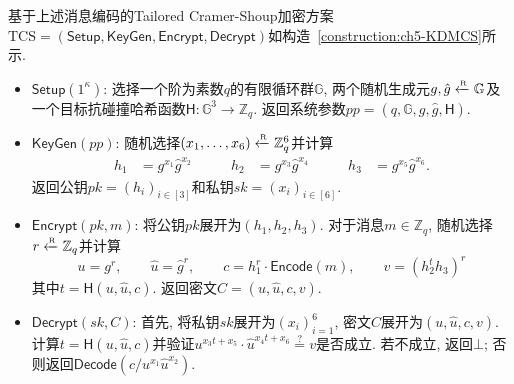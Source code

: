 基于上述消息编码的Tailored Cramer-Shoup加密方案$\text{TCS} = (\mathsf{Setup}, \mathsf{KeyGen}, \mathsf{Encrypt}, \mathsf{Decrypt})$如构造~\ref{construction:ch5-KDMCS}所示.

\begin{construction}\label{construction:ch5-KDMCS}
\begin{itemize}
\item $\mathsf{Setup}(1^\kappa)$: 选择一个阶为素数$q$的有限循环群$\mathbb{G}$, 两个随机生成元$g,\hat{g} \xleftarrow{\textup{\tiny R}} \mathbb{G}$及一个目标抗碰撞哈希函数$\mathsf{H}: \mathbb{G}^3 \rightarrow \mathbb{Z}_q$. 返回系统参数$pp = (q,\mathbb{G}, g, \hat{g}, \mathsf{H})$.

\item $\mathsf{KeyGen}(pp)$: 随机选择$(x_1,\ldots, x_6) \xleftarrow{\textup{\tiny R}} \mathbb{Z}_q^6$并计算
\begin{align*}
h_1 & = g^{x_1} \hat{g}^{x_2} & \qquad h_2 & = g^{x_3} \hat{g}^{x_4} & \qquad h_3 & = g^{x_5}\hat{g}^{x_6}.
\end{align*}
返回公钥$pk = (h_i)_{i\in[3]}$和私钥$sk = (x_i)_{i \in [6]}$.

\item $\mathsf{Encrypt}(pk, m)$: 将公钥$pk$展开为$(h_1, h_2, h_3)$. 对于消息$m \in \mathbb{Z}_q$, 随机选择$r \xleftarrow{\textup{\tiny R}} \mathbb{Z}_q$并计算
\begin{displaymath}
u = g^r, \qquad \hat{u} = \hat{g}^r, \qquad c = h_1^r \cdot \mathsf{Encode}(m), \qquad v = (h_2^th_3)^r
\end{displaymath}
其中$t = \mathsf{H}(u, \hat{u}, c)$. 返回密文$C = (u, \hat{u}, c, v)$.

\item $\mathsf{Decrypt}(sk, C)$: 首先, 将私钥$sk$展开为$(x_i)_{i = 1}^6$, 密文$C$展开为$(u,\hat{u}, c, v)$. 计算$t = \mathsf{H}(u, \hat{u}, c)$并验证$u^{x_3t + x_5} \cdot \hat{u}^{x_4t + x_6} \overset{?}{=} v$是否成立. 若不成立, 返回$\bot$; 否则返回$\mathsf{Decode}(c/u^{x_1}\hat{u}^{x_2})$.
\end{itemize}
\end{construction}

